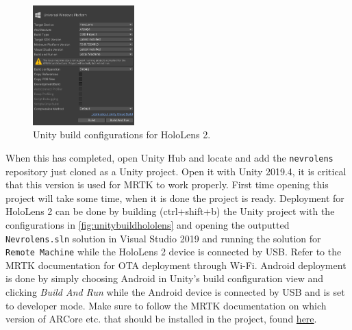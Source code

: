 \begin{figure} 
    \centering
    \includegraphics[width=0.35\textwidth]{fig/unitybuildhololens.png}
    \caption{Unity build configurations for HoloLens 2.}
    \label{fig:unitybuildhololens}
\end{figure}
When this has completed, open Unity Hub and locate and add the \texttt{nevrolens} repository just cloned as a Unity project. Open it with Unity 2019.4, it is critical that this version is used for MRTK to work properly. First time opening this project will take some time, when it is done the project is ready. Deployment for HoloLens 2 can be done by building (ctrl+shift+b) the Unity project with the configurations in \autoref{fig:unitybuildhololens} and opening the outputted \texttt{Nevrolens.sln} solution in Visual Studio 2019 and running the solution for \texttt{Remote Machine} while the HoloLens 2 device is connected by USB. Refer to the MRTK documentation for OTA deployment through Wi-Fi. Android deployment is done by simply choosing Android in Unity's build configuration view and clicking \textit{Build And Run} while the Android device is connected by USB and is set to developer mode. Make sure to follow the MRTK documentation on which version of ARCore etc. that should be installed in the project, found \href{https://microsoft.github.io/MixedRealityToolkit-Unity/version/releases/2.5.1/Documentation/CrossPlatform/UsingARFoundation.html}{here}.
